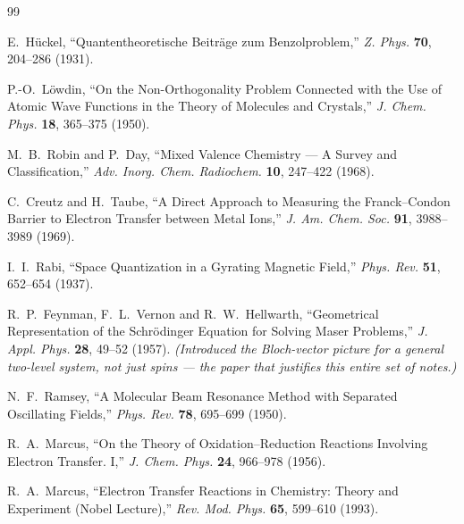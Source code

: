 \begin{thebibliography}{99}
\small

E.~H\"uckel, ``Quantentheoretische Beitr\"age zum Benzolproblem,''
\emph{Z. Phys.} \textbf{70}, 204--286 (1931).

P.-O.~L\"owdin, ``On the Non-Orthogonality Problem Connected with the Use of Atomic
Wave Functions in the Theory of Molecules and Crystals,''
\emph{J. Chem. Phys.} \textbf{18}, 365--375 (1950).

M.~B.~Robin and P.~Day, ``Mixed Valence Chemistry --- A Survey and Classification,''
\emph{Adv. Inorg. Chem. Radiochem.} \textbf{10}, 247--422 (1968).

C.~Creutz and H.~Taube, ``A Direct Approach to Measuring the Franck--Condon Barrier to
Electron Transfer between Metal Ions,''
\emph{J. Am. Chem. Soc.} \textbf{91}, 3988--3989 (1969).

I.~I.~Rabi, ``Space Quantization in a Gyrating Magnetic Field,''
\emph{Phys. Rev.} \textbf{51}, 652--654 (1937).

R.~P.~Feynman, F.~L.~Vernon and R.~W.~Hellwarth, ``Geometrical Representation of the
Schr\"odinger Equation for Solving Maser Problems,''
\emph{J. Appl. Phys.} \textbf{28}, 49--52 (1957).
\emph{(Introduced the Bloch-vector picture for a general two-level system, not just
spins --- the paper that justifies this entire set of notes.)}

N.~F.~Ramsey, ``A Molecular Beam Resonance Method with Separated Oscillating Fields,''
\emph{Phys. Rev.} \textbf{78}, 695--699 (1950).

R.~A.~Marcus, ``On the Theory of Oxidation--Reduction Reactions Involving Electron
Transfer. I,'' \emph{J. Chem. Phys.} \textbf{24}, 966--978 (1956).

R.~A.~Marcus, ``Electron Transfer Reactions in Chemistry: Theory and Experiment
(Nobel Lecture),'' \emph{Rev. Mod. Phys.} \textbf{65}, 599--610 (1993).


\end{thebibliography}
